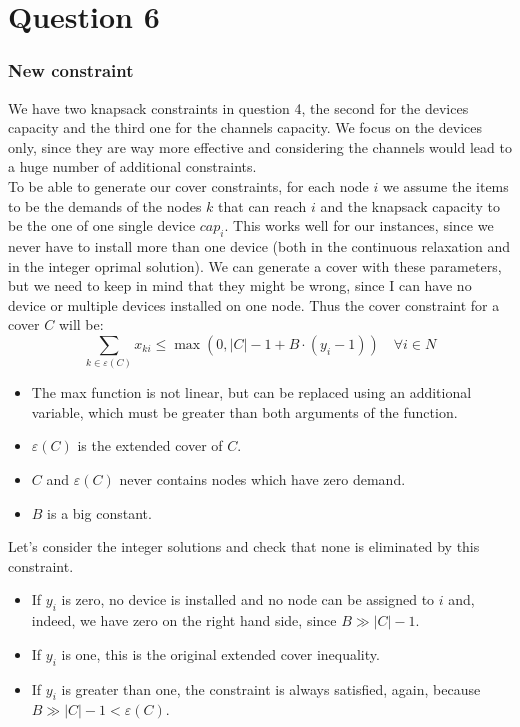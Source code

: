 \section{Question 6}

\subsubsection*{New constraint}

We have two knapsack constraints in question 4, the second for the devices capacity and the third one for the channels capacity. We focus on the devices only, since they are way more effective and considering the channels would lead to a huge number of additional constraints.  \\

To be able to generate our cover constraints, for each node $i$ we assume the items to be the demands of the nodes $k$ that can reach $i$ and the knapsack capacity to be the one of one single device $cap_i$. This works well for our instances, since we never have to install more than one device (both in the continuous relaxation and in the integer oprimal solution).
We can generate a cover with these parameters, but we need to keep in mind that they might be wrong, since I can have no device or multiple devices installed on one node. Thus the cover constraint for a cover $C$ will be:
$$
\sum_{k \in \varepsilon(C)} x_{ki} \leq \max(0, |C| - 1 + B \cdot (y_i - 1)) \quad \forall i \in N
$$

\begin{itemize}
	\item The max function is not linear, but can be replaced using an additional variable, which must be greater than both arguments of the function.
	\item $\varepsilon(C)$ is the extended cover of $C$.
	\item $C$ and $\varepsilon(C)$ never contains nodes which have zero demand.
	\item $B$ is a big constant.
\end{itemize}

Let's consider the integer solutions and check that none is eliminated by this constraint.
\begin{itemize}
	\item If $y_i$ is zero, no device is installed and no node can be assigned to $i$ and, indeed, we have zero on the right hand side, since $B \gg |C| - 1$.
	\item If $y_i$ is one, this is the original extended cover inequality.
	\item If $y_i$ is greater than one, the constraint is always satisfied, again, because $B \gg |C| - 1 < \varepsilon(C)$.
\end{itemize}

